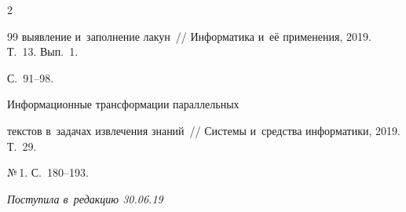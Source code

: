 \begin{multicols}{2}
{{\begin{thebibliography}{99}
выявление и~заполнение лакун~// Информатика и~её применения, 2019. Т.~13. Вып.~1. 


С.~91--98.




 Информационные трансформации параллельных 


текстов в~задачах извлечения знаний~// Системы и~средства информатики, 2019. Т.~29. 


№\,1. С.~180--193.





 \end{thebibliography}





 }


 }





\end{multicols}





\vspace*{-9pt}





\hfill{\small\textit{Поступила в~редакцию 30.06.19}}















\newpage





\vspace*{-28pt}




















